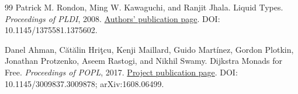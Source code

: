 \documentclass[11pt,a4paper]{article}
\theoremstyle{definition}
\theoremstyle{remark}
\begin{document}
\begin{thebibliography}{99}
 Patrick M. Rondon, Ming W. Kawaguchi, and Ranjit Jhala.
Liquid Types. \emph{Proceedings of PLDI}, 2008.
\href{https://goto.ucsd.edu/~rjhala/papers/liquid_types.html}{Authors' publication page}.
DOI: 10.1145/1375581.1375602.

 Danel Ahman, C\u{a}t\u{a}lin Hri\c{t}cu, Kenji Maillard,
Guido Mart\'{i}nez, Gordon Plotkin, Jonathan Protzenko, Aseem Rastogi, and Nikhil Swamy.
Dijkstra Monads for Free. \emph{Proceedings of POPL}, 2017.
\href{https://fstar-lang.org/papers/dm4free/}{Project publication page}.
DOI: 10.1145/3009837.3009878; arXiv:1608.06499.
\end{thebibliography}
\end{document}
